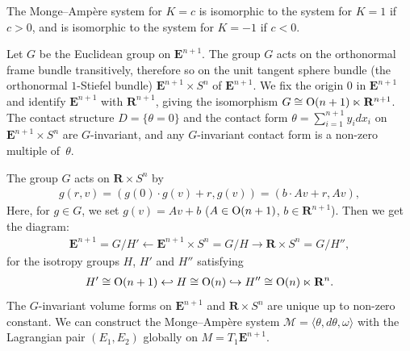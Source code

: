 \documentclass[pdftex]{sigma}
\begin{document}
\begin{Rem}
The Monge--Amp{\`e}re system for $K = c$
is isomorphic to the system for $K = 1$ if $c > 0$,
and is isomorphic to the system for $K = -1$ if
$c < 0$.
\end{Rem}


\begin{Rem}
Let $G$
be the Euclidean group on ${\mathbf{E}}^{n+1}$.
The group $G$ acts on the orthonormal frame bundle transitively, therefore so
on the unit tangent sphere bundle
(the orthonormal $1$-Stiefel bundle)
${\mathbf{E}}^{n+1}\times S^n$ of ${\mathbf{E}}^{n+1}$.
We f\/ix the origin $0$ in ${\mathbf{E}}^{n+1}$ and identify
${\mathbf{E}}^{n+1}$ with ${\mathbf{R}}^{n+1}$, giving
the isomorphism $G \cong {\rm O}(n+1) \ltimes {\mathbf{R}}^{n+1}$.
The contact structure $D = \{ \theta = 0\}$ and
the contact form $\theta = \sum\limits_{i=1}^{n+1} y_idx_i$ on
${\mathbf{E}}^{n+1}\times S^n$ are $G$-invariant, and
any $G$-invariant contact form is a non-zero multiple of~$\theta$.

The group $G$ acts on ${\mathbf{R}} \times S^n$ by
\begin{gather*}
g(r, v) = (g(0)\cdot g(v) + r, g(v)) = (b\cdot Av + r,
Av),
\end{gather*}
Here, for $g \in G$, we set $g(v) = Av + b$
($A \in {\rm O}(n+1)$, $b \in {\mathbf{R}}^{n+1}$).
Then we get the diagram:
\begin{gather*}
{\mathbf{E}}^{n+1} = G/H' \leftarrow {\mathbf{E}}^{n+1}\times S^n = G/H
\rightarrow {\mathbf{R}}\times S^n = G/H'',
\end{gather*}
for the isotropy groups $H$, $H'$ and $H''$ satisfying
\begin{gather*}
H' \cong {\rm O}(n+1) \hookleftarrow H \cong {\rm O}(n)
\hookrightarrow H'' \cong {\rm O}(n) \ltimes {\mathbf{R}}^n.
\end{gather*}
The $G$-invariant volume forms on ${\mathbf{E}}^{n+1}$ and ${\mathbf{R}}\times S^n$
are unique up to non-zero constant.
We can construct
the Monge--Amp{\`e}re system $\mathcal{M}=\langle \theta, d\theta,
\omega \rangle $
with the Lagrangian pair $(E_1,E_2)$ globally on $M=T_1{\mathbf{E}}^{n+1}$.
\end{Rem}
\end{document}

